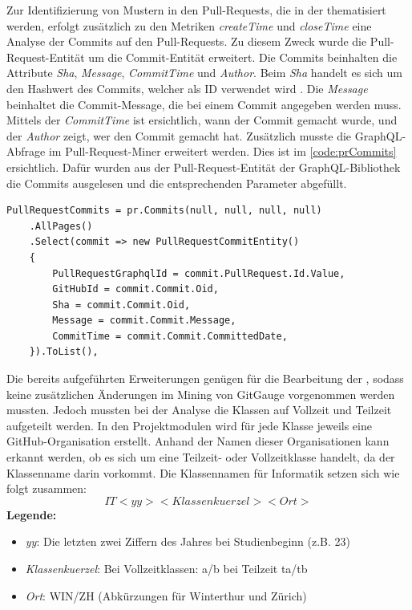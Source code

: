 Zur Identifizierung von Mustern in den Pull-Requests, die in der  thematisiert werden, erfolgt zusätzlich zu den Metriken \textit{createTime} und \textit{closeTime} eine Analyse der Commits auf den Pull-Requests. Zu diesem Zweck wurde die Pull-Request-Entität um die Commit-Entität erweitert. Die Commits beinhalten die Attribute \textit{Sha}, \textit{Message}, \textit{CommitTime} und \textit{Author}. Beim \textit{Sha} handelt es sich um den Hashwert des Commits, welcher als ID verwendet wird \parencite{noauthor_git_nodate}. Die \textit{Message} beinhaltet die Commit-Message, die bei einem Commit angegeben werden muss. Mittels der \textit{CommitTime} ist ersichtlich, wann der Commit gemacht wurde, und der \textit{Author} zeigt, wer den Commit gemacht hat. Zusätzlich musste die GraphQL-Abfrage im Pull-Request-Miner erweitert werden. Dies ist im \autoref{code:prCommits} ersichtlich. Dafür wurden aus der Pull-Request-Entität der GraphQL-Bibliothek die Commits ausgelesen und die entsprechenden Parameter abgefüllt.
\begin{lstlisting}[language=CSharp, caption={GraphQL-Abfrage Pull-Request-Commits}, label={code:prCommits}]
PullRequestCommits = pr.Commits(null, null, null, null)
    .AllPages()
    .Select(commit => new PullRequestCommitEntity()
    {
        PullRequestGraphqlId = commit.PullRequest.Id.Value,
        GitHubId = commit.Commit.Oid,
        Sha = commit.Commit.Oid,
        Message = commit.Commit.Message,
        CommitTime = commit.Commit.CommittedDate,
    }).ToList(),
\end{lstlisting}

Die bereits aufgeführten Erweiterungen genügen für die Bearbeitung der , sodass keine zusätzlichen Änderungen im Mining von GitGauge vorgenommen werden mussten. Jedoch mussten bei der Analyse die Klassen auf Vollzeit und Teilzeit aufgeteilt werden. In den Projektmodulen wird für jede Klasse jeweils eine GitHub-Organisation erstellt. Anhand der Namen dieser Organisationen kann erkannt werden, ob es sich um eine Teilzeit- oder Vollzeitklasse handelt, da der Klassenname darin vorkommt. Die Klassennamen für Informatik setzen sich wie folgt zusammen: 
\begin{equation}
IT<yy><Klassenkuerzel><Ort>
\end{equation}
\noindent\textbf{Legende:}
\begin{itemize}
  \item \textit{yy}: Die letzten zwei Ziffern des Jahres bei Studienbeginn (z.B. 23)
  \item\textit{Klassenkuerzel}: Bei Vollzeitklassen: a/b bei Teilzeit ta/tb
  \item\textit{Ort}: WIN/ZH (Abkürzungen für Winterthur und Zürich)
\end{itemize}

